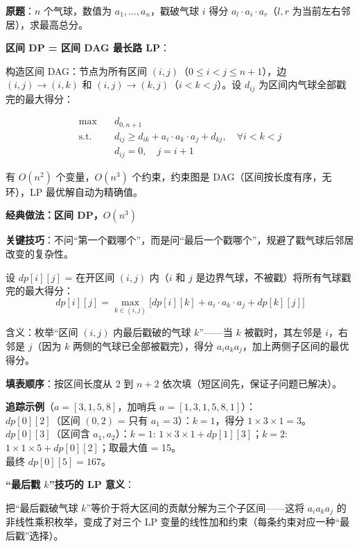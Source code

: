 \documentclass[12pt, a4paper]{ctexart}
\begin{document}
\begin{blackboard}

\textbf{原题}：$n$ 个气球，数值为 $a_1, \ldots, a_n$，戳破气球 $i$ 得分 $a_l \cdot a_i \cdot a_r$（$l,r$ 为当前左右邻居），求最高总分。

\textbf{区间 DP = 区间 DAG 最长路 LP}：

构造区间 DAG：节点为所有区间 $(i,j)$（$0 \leq i < j \leq n+1$），边 $(i,j) \to (i,k)$ 和 $(i,j) \to (k,j)$（$i < k < j$）。设 $d_{ij}$ 为区间内气球全部戳完的最大得分：

\begin{align}
\max \quad & d_{0,n+1} \\
\text{s.t.} \quad & d_{ij} \geq d_{ik} + a_i \cdot a_k \cdot a_j + d_{kj}, \quad \forall i < k < j \\
& d_{ij} = 0, \quad j = i+1
\end{align}

有 $O(n^2)$ 个变量，$O(n^3)$ 个约束，约束图是 DAG（区间按长度有序，无环），LP 最优解自动为精确值。

\textbf{经典做法：区间 DP，$O(n^3)$}

\textbf{关键技巧}：不问``第一个戳哪个''，而是问``最后一个戳哪个''，规避了戳气球后邻居改变的复杂性。

设 $dp[i][j]$ = 在开区间 $(i,j)$ 内（$i$ 和 $j$ 是边界气球，不被戳）将所有气球戳完的最大得分：
$$dp[i][j] = \max_{k \in (i,j)} \bigl[dp[i][k] + a_i \cdot a_k \cdot a_j + dp[k][j]\bigr]$$

含义：枚举``区间 $(i,j)$ 内最后戳破的气球 $k$''——当 $k$ 被戳时，其左邻是 $i$，右邻是 $j$（因为 $k$ 两侧的气球已全部被戳完），得分 $a_i a_k a_j$，加上两侧子区间的最优得分。

\textbf{填表顺序}：按区间长度从 2 到 $n+2$ 依次填（短区间先，保证子问题已解决）。

\textbf{追踪示例}（$a = [3,1,5,8]$，加哨兵 $a = [1,3,1,5,8,1]$）：\\
$dp[0][2]$（区间 $(0,2)$ = 只有 $a_1=3$）：$k=1$，得分 $1 \times 3 \times 1 = 3$。\\
$dp[0][3]$（区间含 $a_1,a_2$）：$k=1$: $1\times3\times1 + dp[1][3]$；$k=2$: $1\times1\times5 + dp[0][2]$；取最大值 = 15。\\
最终 $dp[0][5] = 167$。

\textbf{``最后戳 $k$''技巧的 LP 意义}：

把``最后戳破气球 $k$''等价于将大区间的贡献分解为三个子区间——这将 $a_i a_k a_j$ 的非线性乘积枚举，变成了对三个 LP 变量的线性加和约束（每条约束对应一种``最后戳''选择）。


\end{blackboard}
\end{document}

